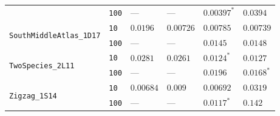 \documentclass{article}
\begin{document}
\begin{footnotesize}
\begin{tabular}{llllll}
 & \texttt{100} & --- & --- & $\mathbf{0.00397}^*$ & $0.0394$ \\
\cline{1-6}
\multirow[c]{2}{*}{\texttt{SouthMiddleAtlas\_1D17}} & \texttt{10} & $0.0196$ & $\mathbf{0.00726}$ & $0.00785$ & $0.00739$ \\
 & \texttt{100} & --- & --- & $\mathbf{0.0145}$ & $0.0148$ \\
\cline{1-6}
\multirow[c]{2}{*}{\texttt{TwoSpecies\_2L11}} & \texttt{10} & $0.0281$ & $0.0261$ & $\mathbf{0.0124}^*$ & $0.0127$ \\
 & \texttt{100} & --- & --- & $0.0196$ & $\mathbf{0.0168}^*$ \\
\cline{1-6}
\multirow[c]{2}{*}{\texttt{Zigzag\_1S14}} & \texttt{10} & $\mathbf{0.00684}$ & $0.009$ & $0.00692$ & $0.0319$ \\
 & \texttt{100} & --- & --- & $\mathbf{0.0117}^*$ & $0.142$ \\
\cline{1-6}
\bottomrule
\end{tabular}
\end{footnotesize}
\end{document}
